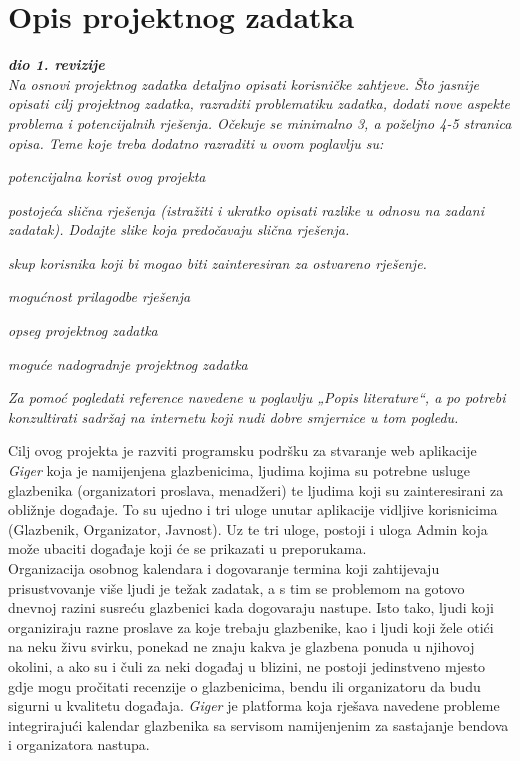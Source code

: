 \chapter{Opis projektnog zadatka}
		
		\textbf{\textit{dio 1. revizije}}\\
		
		\textit{Na osnovi projektnog zadatka detaljno opisati korisničke zahtjeve. Što jasnije opisati cilj projektnog zadatka, razraditi problematiku zadatka, dodati nove aspekte problema i potencijalnih rješenja. Očekuje se minimalno 3, a poželjno 4-5 stranica opisa.	Teme koje treba dodatno razraditi u ovom poglavlju su:}
		\begin{packed_item}
			\item \textit{potencijalna korist ovog projekta}
			\item \textit{postojeća slična rješenja (istražiti i ukratko opisati razlike u odnosu na zadani zadatak). Dodajte slike koja predočavaju slična rješenja.}
			\item \textit{skup korisnika koji bi mogao biti zainteresiran za ostvareno rješenje.}
			\item \textit{mogućnost prilagodbe rješenja }
			\item \textit{opseg projektnog zadatka}
			\item \textit{moguće nadogradnje projektnog zadatka}
		\end{packed_item}
		
		\textit{Za pomoć pogledati reference navedene u poglavlju „Popis literature“, a po potrebi konzultirati sadržaj na internetu koji nudi dobre smjernice u tom pogledu.}
		\eject
		
		Cilj ovog projekta je razviti programsku podršku za stvaranje web aplikacije \textit{Giger} koja je namijenjena glazbenicima, ljudima kojima su potrebne usluge glazbenika (organizatori proslava, menadžeri) te ljudima koji su zainteresirani za obližnje događaje. To su ujedno i tri uloge unutar aplikacije vidljive korisnicima (Glazbenik, Organizator, Javnost). Uz te tri uloge, postoji i uloga Admin koja može ubaciti događaje koji će se prikazati u preporukama.
		\\
		
		Organizacija osobnog kalendara i dogovaranje termina koji zahtijevaju prisustvovanje više ljudi je težak zadatak, a s tim se problemom na gotovo dnevnoj razini susreću glazbenici kada dogovaraju nastupe. Isto tako, ljudi koji organiziraju razne proslave za koje trebaju glazbenike, kao i ljudi koji žele otići na neku živu svirku, ponekad ne znaju kakva je glazbena ponuda u njihovoj okolini, a ako su i čuli za neki događaj u blizini, ne postoji jedinstveno mjesto gdje mogu pročitati recenzije o glazbenicima, bendu ili organizatoru da budu sigurni u kvalitetu događaja.
		\textit{Giger} je platforma koja rješava navedene probleme integrirajući kalendar glazbenika sa servisom namijenjenim za sastajanje bendova i organizatora nastupa. 
		\\
		
